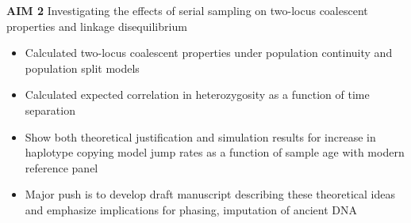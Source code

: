 \documentclass[a4paper, 11pt]{article}
\begin{document}
 \textbf{AIM 2} Investigating the effects of serial sampling on two-locus coalescent properties and linkage disequilibrium\\
  \begin{itemize}
    \item Calculated two-locus coalescent properties under population continuity and population split models
    \item Calculated expected correlation in heterozygosity as a function of time separation
    \item Show both theoretical justification and simulation results for increase in haplotype copying model jump rates as a function of sample age with modern reference panel
    \item Major push is to develop draft manuscript describing these theoretical ideas and emphasize implications for phasing, imputation of ancient DNA
  \end{itemize}





\end{document}
